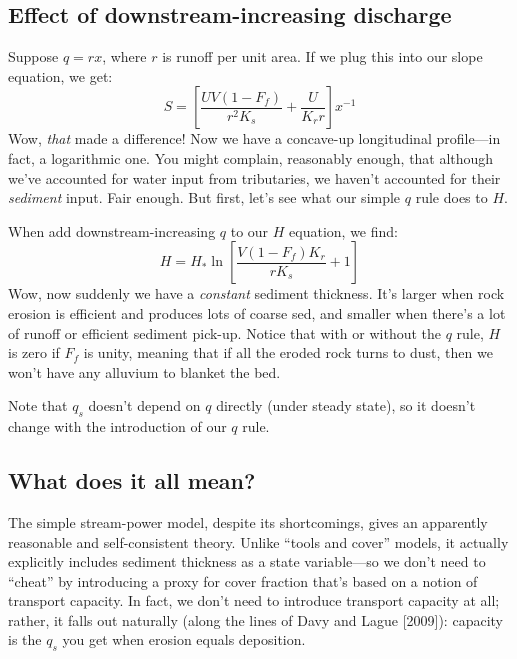 \documentclass[12pt]{amsart}
\begin{document}
\subsection{Effect of downstream-increasing discharge}

Suppose $q = r x$, where $r$ is runoff per unit area. If we plug this into our slope equation, we get:
\begin{equation}
S = \left[ \frac{UV (1 - F_f)}{r^2 K_s} + \frac{U}{K_r r} \right] x^{-1}
\end{equation}
Wow, {\em that} made a difference! Now we have a concave-up longitudinal profile---in fact, a logarithmic one. You might complain, reasonably enough, that although we've accounted for water input from tributaries, we haven't accounted for their {\em sediment} input. Fair enough. But first, let's see what our simple $q$ rule does to $H$.

When add downstream-increasing $q$ to our $H$ equation, we find:
\begin{equation}
H = H_* \ln \left[ \frac{V (1 - F_f) K_r}{r K_s} + 1 \right]
\end{equation}
Wow, now suddenly we have a {\em constant} sediment thickness. It's larger when rock erosion is efficient and produces lots of coarse sed, and smaller when there's a lot of runoff or efficient sediment pick-up. Notice that with or without the $q$ rule, $H$ is zero if $F_f$ is unity, meaning that if all the eroded rock turns to dust, then we won't have any alluvium to blanket the bed.

Note that $q_s$ doesn't depend on $q$ directly (under steady state), so it doesn't change with the introduction of our $q$ rule.

\subsection{What does it all mean?}

The simple stream-power model, despite its shortcomings, gives an apparently reasonable and self-consistent theory. Unlike ``tools and cover'' models, it actually explicitly includes sediment thickness as a state variable---so we don't need to ``cheat'' by introducing a proxy for cover fraction that's based on a notion of transport capacity. In fact, we don't need to introduce transport capacity at all; rather, it falls out naturally (along the lines of Davy and Lague [2009]): capacity is the $q_s$ you get when erosion equals deposition.






\end{document}

